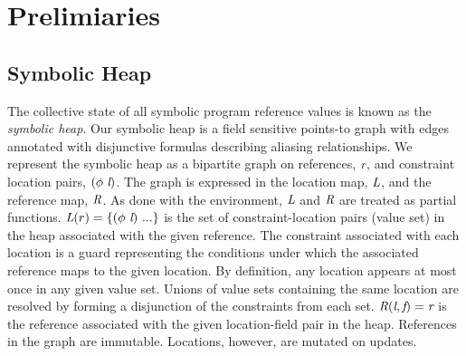 \section{Prelimiaries}
\label{sec:sh}

\subsection{Symbolic Heap}


The collective state of all symbolic program reference values
is known as the \emph{symbolic heap}. Our symbolic heap 
is a field sensitive points-to graph with edges
annotated with disjunctive formulas describing aliasing
relationships. We represent the symbolic heap as a bipartite graph on
references, $\emph{r}$, and constraint location pairs,
$(\phi\ \emph{l})$. The graph is expressed in the location map,
$\emph{L}$, and the reference map, $\emph{R}$. As done with the
environment, $\emph{L}$ and $\emph{R}$ are treated as partial
functions. $\cfgnt{L}(r) = \{(\phi\ \cfgnt{l})\ ...\}$ is the set
of constraint-location pairs (value set) in the heap associated with the given
reference. The constraint associated with each location is a guard
representing the conditions under which the associated reference
maps to the given location. By definition, any location appears 
at most once in any given value set. Unions of value sets containing
the same location are resolved by forming a disjunction of the constraints
from each set. $\emph{R}(\emph{l}, \emph{f}) = \emph{r}$ is the
reference associated with the given location-field pair in the
heap. References in the graph are immutable. Locations, however, are
mutated on updates. 

